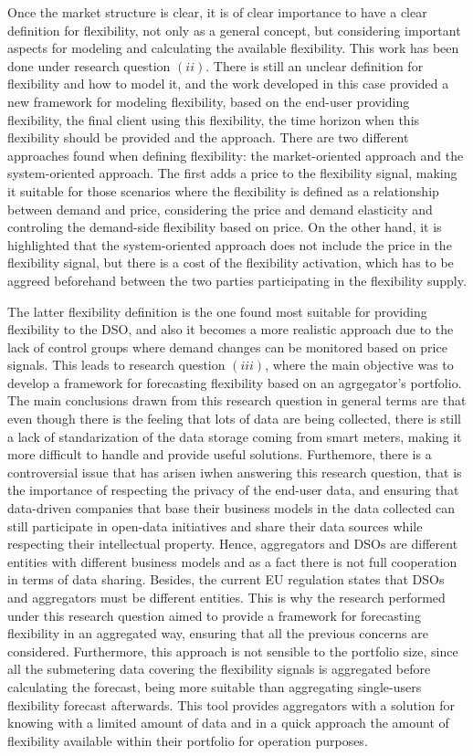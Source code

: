 Once the market structure is clear, it is of clear importance to have a clear definition for flexibility, not only as a general concept, but considering important aspects for modeling and calculating the available flexibility. This work has been done under research question $(ii)$. There is still an unclear definition for flexibility and how to model it, and the work developed in this case provided a new framework for modeling flexibility, based on the end-user providing flexibility, the final client using this flexibility, the time horizon when this flexibility should be provided and the approach. There are two different approaches found when defining flexibility: the market-oriented approach and the system-oriented approach. The first adds a price to the flexibility signal, making it suitable for those scenarios where the flexibility is defined as a relationship between demand and price, considering the price and demand elasticity and controling the demand-side flexibility based on price. On the other hand, it is highlighted that the system-oriented approach does not include the price in the flexibility signal, but there is a cost of the flexibility activation, which has to be aggreed beforehand between the two parties participating in the flexibility supply. 

The latter flexibility definition is the one found most suitable for providing flexibility to the DSO, and also it becomes a more realistic approach due to the lack of control groups where demand changes can be monitored based on price signals. This leads to research question $(iii)$, where the main objective was to develop a framework for forecasting flexibility based on an agrgegator's portfolio. The main conclusions drawn from this research question in general terms are that even though there is the feeling that lots of data are being collected, there is still a lack of standarization of the data storage coming from smart meters, making it more difficult to handle and provide useful solutions. Furthemore, there is a controversial issue that has arisen iwhen answering this research question, that is the importance of respecting the privacy of the end-user data, and ensuring that data-driven companies that base their business models in the data collected can still participate in open-data initiatives and share their data sources while respecting their intellectual property. Hence, aggregators and DSOs are different entities with different business models and as a fact there is not full cooperation in terms of data sharing. Besides, the current EU regulation states that DSOs and aggregators must be different entities. This is why the research performed under this research question aimed to provide a framework for forecasting flexibility in an aggregated way, ensuring that all the previous concerns are considered. Furthermore, this approach is not sensible to the portfolio size, since all the submetering data covering the flexibility signals is aggregated before calculating the forecast, being more suitable than aggregating single-users flexibility forecast afterwards. This tool provides aggregators with a solution for knowing with a limited amount of data and in a quick approach the amount of flexibility available within their portfolio for operation purposes. 

